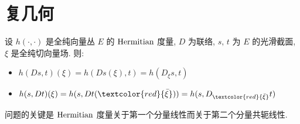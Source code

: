 \chapter{复几何}

    \begin{example}
        设 $h(\cdot,\cdot)$ 是全纯向量丛 $E$ 的 ${\rm Hermitian}$ 度量, $D$ 为联络, $s,\,t$ 为 $E$ 的光滑截面, $\xi$ 是全纯切向量场. 则:
        \begin{itemize}
            \item $h(Ds,t)(\xi) = h(Ds(\xi),t)=h(D_{\xi}s,t)$
            \item $h(s,Dt)(\xi) = h(s,Dt(\textcolor{red}{\bar{\xi}}))=h(s,D_{\textcolor{red}{\bar{\xi}}}t)$ 
        \end{itemize}
        问题的关键是 ${\rm Hermitian}$ 度量关于第一个分量线性而关于第二个分量共轭线性.
    \end{example}

